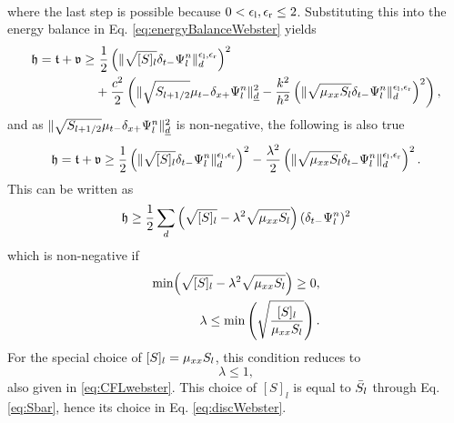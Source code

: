 {\begin{align*}
\end{align*}
where the last step is possible because $0 < \epsilon_\text{l}, \epsilon_\text{r} \leq 2$.
Substituting this into the energy balance in Eq. \eqref{eq:energyBalanceWebster} yields
\begin{align*}
    \mathfrak{h} = \mathfrak{t} + \mathfrak{v} \geq &\  \frac{1}{2} \left(\lVert\sqrt{[S]_l} \delta_{t-} \Psi_l^n \rVert_d^{\epsilon_\text{l}, \epsilon_\text{r}}\right)^2 \\
    &+ \frac{c^2}{2}\left(\lVert\sqrt{S_{l+1/2}}\mu_{t-}\delta_{x+}\Psi_l^n\rVert_{\underline{d}}^2 - \frac{k^2}{h^2}\left(\lVert\sqrt{\mu_{xx} S_l}\delta_{t-}\Psi_l^n\rVert_{d}^{\epsilon_\text{l},\epsilon_\text{r}}\right)^2\right),
\end{align*}
and as $\lVert\sqrt{S_{l+1/2}}\mu_{t-}\delta_{x+}\Psi_l^n\rVert_{\underline{d}}^2$ is non-negative, the following is also true
\begin{equation*}
    \mathfrak{h} = \mathfrak{t} + \mathfrak{v} \geq \frac{1}{2} \left(\lVert\sqrt{[S]_l} \delta_{t-} \Psi_l^n \rVert_d^{\epsilon_\text{l}, \epsilon_\text{r}}\right)^2- \frac{\lambda^2}{2}\left(\lVert\sqrt{\mu_{xx} S_l}\delta_{t-}\Psi_l^n\rVert_{d}^{\epsilon_\text{l},\epsilon_\text{r}}\right)^2.
\end{equation*}
This can be written as
\begin{equation}
    \mathfrak{h} \geq \frac{1}{2} \sum_d \left(\sqrt{[S]_l} - \lambda^2\sqrt{\mu_{xx} S_l}\right)(\delta_{t-} \Psi_l^n)^2 
\end{equation}
which is non-negative if
\begin{align*}
    \text{min}\Big(\sqrt{[S]_l} - \lambda^2\sqrt{\mu_{xx} S_l}\Big) \geq 0,\\
    \lambda \leq \text{min}\left(\sqrt{\frac{[S]_l}{\mu_{xx} S_l}}\right).
\end{align*}
For the special choice of $[S]_l = \mu_{xx} S_l$, this condition reduces to
\begin{equation}
    \lambda \leq 1,
\end{equation}
also given in \eqref{eq:CFLwebster}. This choice of $[S]_l$ is equal to $\bar{S}_l$ through Eq. \eqref{eq:Sbar}, hence its choice in Eq. \eqref{eq:discWebster}.


}
